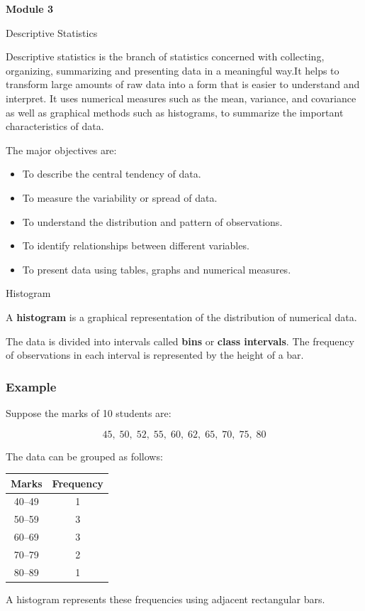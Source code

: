 \documentclass[aspectratio=169]{beamer}
\begin{document}
\begin{frame}
    \centering
    \vfill
    {\Huge \textbf{Module 3}}
\end{frame}
\begin{frame}{Descriptive Statistics}

Descriptive statistics is the branch of statistics concerned with collecting, organizing, summarizing and presenting data in a meaningful way.It helps to transform large amounts of raw data into a form that is easier to understand and interpret. It uses numerical measures such as the mean, variance, and covariance as well as graphical methods such as histograms, to summarize the important characteristics of data.

The major objectives are:

\begin{itemize} 
\item To describe the central tendency of data. 
\item To measure the variability or spread of data. \item To understand the distribution and pattern of observations.
\item To identify relationships between different variables. 
\item To present data using tables, graphs and numerical measures. 
\end{itemize}


\end{frame}

\begin{frame}{Histogram}


A \textbf{histogram} is a graphical representation of the distribution
of numerical data.

The data is divided into intervals called \textbf{bins} or
\textbf{class intervals}. The frequency of observations in each
interval is represented by the height of a bar.

\subsubsection*{Example}

Suppose the marks of 10 students are:

\[
45,\;50,\;52,\;55,\;60,\;62,\;65,\;70,\;75,\;80
\]

The data can be grouped as follows:

\begin{center}
\begin{tabular}{cc}
\toprule
\textbf{Marks} & \textbf{Frequency}\\
\midrule
40--49 & 1\\
50--59 & 3\\
60--69 & 3\\
70--79 & 2\\
80--89 & 1\\
\bottomrule
\end{tabular}
\end{center}

A histogram represents these frequencies using adjacent rectangular
bars.
\end{frame}
\end{document}
